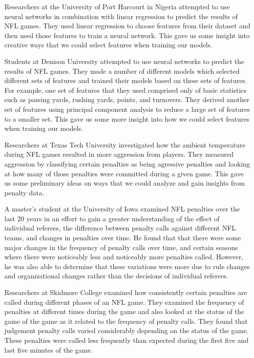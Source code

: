\documentclass[sigconf, nonacm]{acmart}
\begin{document}
Researchers at the University of Port Harcourt in Nigeria \cite{Anyama15}
attempted to use neural networks in combination with linear regression to
predict the results of NFL games. They used linear regression to choose features
from their dataset and then used those features to train a neural network. This
gave us some insight into creative ways that we could select features when
training our models.

Students at Denison University \cite{Blaikie11} attempted to use neural networks
to predict the results of NFL games. They
made a number of different models which selected different sets of features and
trained their models based on these sets of features. For example, one set of
features that they used comprised only of basic statistics such as passing
yards, rushing yards, points, and turnovers. They derived another set of
features using principal component analysis to reduce a large set of features to
a smaller set. This gave us some more insight into how we could select features
when training our models.

Researchers at Texas Tech University \cite{Craig16} investigated how the
ambient temperature during NFL games resulted in more aggression from players.
They measured aggression by classifying certain penalties as being agressive
penalties and looking at how many of those penalties were committed during a
given game. This gave us some preliminary ideas on ways that we could analyze
and gain insights from penalty data.

A master's student at the University of Iowa \cite{McDaniel21} examined NFL
penalties over the last 20 years in an effort to gain a greater understanding of
the effect of individual referees, the difference between penalty calls against
different NFL teams, and changes in penalties over time. He found that that
there were some major changes in the frequency of penalty calls over time, and
certain seasons where there were noticeably less and noticeably more penalties
called. However, he was also able to determine that these variations were more
due to rule changes and organizational changes rather than the decisions of
individual referees.

Researchers at Skidmore College \cite{Snyder15} examined how consistently
certain penalties are called during different phases of an NFL game. They
examined the frequency of penalties at different times during the game and also
looked at the status of the game of the game as it related to the frequency of
penalty calls. They found that judgement penalty calls varied considerably
depending on the status of the game. These penalties were called less frequently
than expected during the first five and last five minutes of the game.
\end{document}
